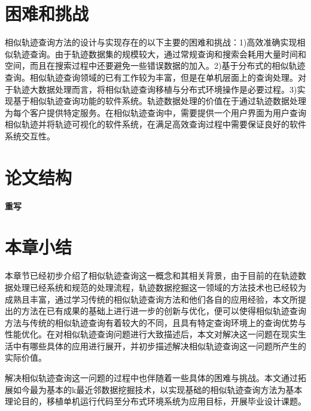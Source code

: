 \section{困难和挑战}
\label{sec:difficulty}
相似轨迹查询方法的设计与实现存在的以下主要的困难和挑战：1)高效准确实现相似轨迹查询。由于轨迹数据集的规模较大，通过常规查询和搜索会耗用大量时间和空间，而且在搜索过程中还要避免一些错误数据的加入。2)基于分布式的相似轨迹查询。相似轨迹查询领域的已有工作较为丰富，但是在单机层面上的查询处理。对于轨迹大数据处理而言，将相似轨迹查询移植与分布式环境操作是必要过程。3)实现基于相似轨迹查询功能的软件系统。轨迹数据处理的价值在于通过轨迹数据处理为每个客户提供特定服务。在相似轨迹查询中，需要提供一个用户界面为用户查询相似轨迹并将轨迹可视化的软件系统，在满足高效查询过程中需要保证良好的软件系统交互性。

\section{论文结构}
\label{sec:requirements}
\textbf{重写}
\\

\section{本章小结}
\label{sec:requirements}
本章节已经初步介绍了相似轨迹查询这一概念和其相关背景，由于目前的在轨迹数据处理已经系统和规范的处理流程，轨迹数据挖掘这一领域的方法技术也已经较为成熟且丰富，通过学习传统的相似轨迹查询方法和他们各自的应用经验，本文所提出的方法在已有成果的基础上进行进一步的创新与优化，便可以使得相似轨迹查询方法与传统的相似轨迹查询有着较大的不同，且具有特定查询环境上的查询优势与性能优化。在对相似轨迹查询问题进行大致描述后，本文对解决这一问题在现实生活中有哪些具体的应用进行展开，并初步描述解决相似轨迹查询这一问题所产生的实际价值。

解决相似轨迹查询这一问题的过程中也伴随着一些具体的困难与挑战。本文通过拓展如今最为基本的k最近邻数据挖掘技术，以实现基础的相似轨迹查询方法为基本理论目的，移植单机运行代码至分布式环境系统为应用目标，开展毕业设计课题。


